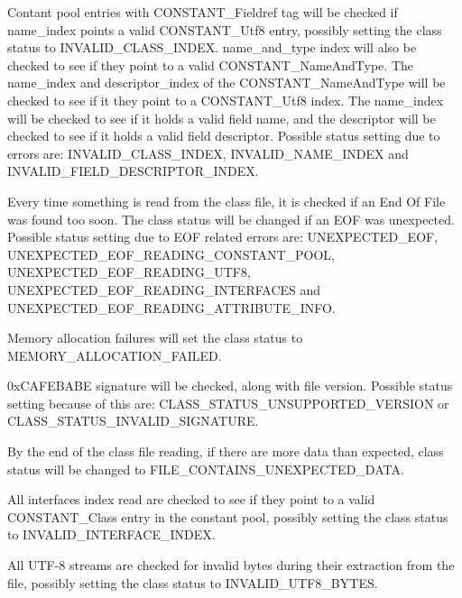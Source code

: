 \begin{DoxyItemize}
\item Contant pool entries with C\+O\+N\+S\+T\+A\+N\+T\+\_\+\+Fieldref tag will be checked if name\+\_\+index points a valid C\+O\+N\+S\+T\+A\+N\+T\+\_\+\+Utf8 entry, possibly setting the class status to I\+N\+V\+A\+L\+I\+D\+\_\+\+C\+L\+A\+S\+S\+\_\+\+I\+N\+D\+EX. name\+\_\+and\+\_\+type index will also be checked to see if they point to a valid C\+O\+N\+S\+T\+A\+N\+T\+\_\+\+Name\+And\+Type. The name\+\_\+index and descriptor\+\_\+index of the C\+O\+N\+S\+T\+A\+N\+T\+\_\+\+Name\+And\+Type will be checked to see if it they point to a C\+O\+N\+S\+T\+A\+N\+T\+\_\+\+Utf8 index. The name\+\_\+index will be checked to see if it holds a valid field name, and the descriptor will be checked to see if it holds a valid field descriptor. Possible status setting due to errors are\+: I\+N\+V\+A\+L\+I\+D\+\_\+\+C\+L\+A\+S\+S\+\_\+\+I\+N\+D\+EX, I\+N\+V\+A\+L\+I\+D\+\_\+\+N\+A\+M\+E\+\_\+\+I\+N\+D\+EX and I\+N\+V\+A\+L\+I\+D\+\_\+\+F\+I\+E\+L\+D\+\_\+\+D\+E\+S\+C\+R\+I\+P\+T\+O\+R\+\_\+\+I\+N\+D\+EX.
\item Every time something is read from the class file, it is checked if an End Of File was found too soon. The class status will be changed if an E\+OF was unexpected. Possible status setting due to E\+OF related errors are\+: U\+N\+E\+X\+P\+E\+C\+T\+E\+D\+\_\+\+E\+OF, U\+N\+E\+X\+P\+E\+C\+T\+E\+D\+\_\+\+E\+O\+F\+\_\+\+R\+E\+A\+D\+I\+N\+G\+\_\+\+C\+O\+N\+S\+T\+A\+N\+T\+\_\+\+P\+O\+OL, U\+N\+E\+X\+P\+E\+C\+T\+E\+D\+\_\+\+E\+O\+F\+\_\+\+R\+E\+A\+D\+I\+N\+G\+\_\+\+U\+T\+F8, U\+N\+E\+X\+P\+E\+C\+T\+E\+D\+\_\+\+E\+O\+F\+\_\+\+R\+E\+A\+D\+I\+N\+G\+\_\+\+I\+N\+T\+E\+R\+F\+A\+C\+ES and U\+N\+E\+X\+P\+E\+C\+T\+E\+D\+\_\+\+E\+O\+F\+\_\+\+R\+E\+A\+D\+I\+N\+G\+\_\+\+A\+T\+T\+R\+I\+B\+U\+T\+E\+\_\+\+I\+N\+FO.
\item Memory allocation failures will set the class status to M\+E\+M\+O\+R\+Y\+\_\+\+A\+L\+L\+O\+C\+A\+T\+I\+O\+N\+\_\+\+F\+A\+I\+L\+ED.
\item 0x\+C\+A\+F\+E\+B\+A\+BE signature will be checked, along with file version. Possible status setting because of this are\+: C\+L\+A\+S\+S\+\_\+\+S\+T\+A\+T\+U\+S\+\_\+\+U\+N\+S\+U\+P\+P\+O\+R\+T\+E\+D\+\_\+\+V\+E\+R\+S\+I\+ON or C\+L\+A\+S\+S\+\_\+\+S\+T\+A\+T\+U\+S\+\_\+\+I\+N\+V\+A\+L\+I\+D\+\_\+\+S\+I\+G\+N\+A\+T\+U\+RE.
\item By the end of the class file reading, if there are more data than expected, class status will be changed to F\+I\+L\+E\+\_\+\+C\+O\+N\+T\+A\+I\+N\+S\+\_\+\+U\+N\+E\+X\+P\+E\+C\+T\+E\+D\+\_\+\+D\+A\+TA.
\item All interfaces\textquotesingle{} index read are checked to see if they point to a valid C\+O\+N\+S\+T\+A\+N\+T\+\_\+\+Class entry in the constant pool, possibly setting the class status to I\+N\+V\+A\+L\+I\+D\+\_\+\+I\+N\+T\+E\+R\+F\+A\+C\+E\+\_\+\+I\+N\+D\+EX.
\item All U\+T\+F-\/8 streams are checked for invalid bytes during their extraction from the file, possibly setting the class status to I\+N\+V\+A\+L\+I\+D\+\_\+\+U\+T\+F8\+\_\+\+B\+Y\+T\+ES.
\end{DoxyItemize}

